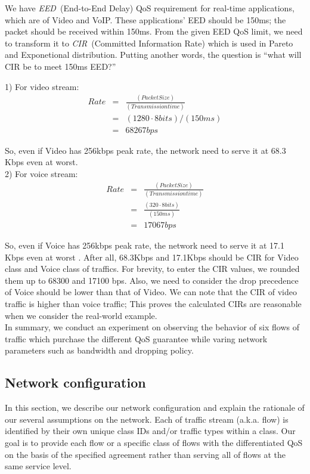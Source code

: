 \documentclass[letterpaper, 10 pt, conference]{ieeeconf}  %
\begin{document}
We have \emph{EED}~(End-to-End Delay) QoS requirement for real-time applications, which are of Video and VoIP.
These applications' EED should be 150ms; the packet should be received within 150ms. 
From the given EED QoS limit, we need to transform it to \emph{CIR}~(Committed Information Rate) which is used in Pareto and Exponetional distribution.
Putting another words, the question is “what will CIR be to meet 150ms EED?”


1) For video stream:
\begin{eqnarray}
Rate  & = & \frac{(Packet Size)} {(Transmission time)} \nonumber \\
      & = & (1280\cdot8 bits)/(150ms) \nonumber \\
      & = & 68267 bps \nonumber
\end{eqnarray}

So, even if Video has 256kbps peak rate, the network need to serve it at 68.3
Kbps even at worst.\\


2) For voice stream:
\begin{eqnarray}
       Rate  & = & \frac{(Packet Size)} {(Transmission time)}\nonumber\\
             & = & \frac{(320\cdot8 bits)} {(150ms)}\nonumber \\
             & = & 17067 bps \nonumber
\end{eqnarray}

So, even if Voice has 256kbps peak rate, the network need to serve it at 17.1 Kbps even at worst .
After all, 68.3Kbps and 17.1Kbps should be CIR for Video class and Voice class of traffics.
For brevity, to enter the CIR values, we rounded them up to 68300 and 17100 bps.
Also, we need to consider the drop precedence of Voice should be lower than
that of Video. We can note that the CIR of video traffic is higher than voice
traffic; This proves the calculated CIRs are reasonable when we consider the
real-world example.\\

In summary, we conduct an experiment on observing the behavior of six flows of traffic
which purchase the different QoS guarantee while varing network parameters such
as bandwidth and dropping policy.


\subsection{\bf{Network configuration}}
\label{sec:configuration}
\noindent 
In this section, we describe our network configuration and explain the
rationale of our several assumptions on the network.
Each of traffic stream (a.k.a. flow) is identified by their own unique class
IDs and/or traffic types within a class. Our goal is to provide each flow or a
specific class of flows with the differentiated QoS on the basis of the specified agreement rather than serving
all of flows at the same service level. 
\end{document}

